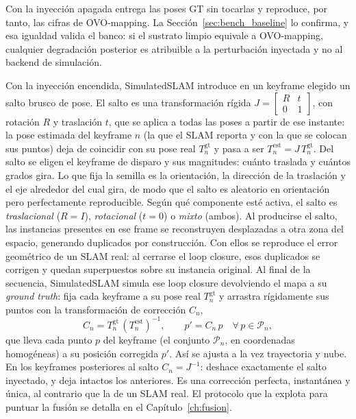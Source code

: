 Con la inyección apagada entrega las poses GT sin tocarlas y reproduce, por tanto, las cifras
de OVO-mapping. La Sección~\ref{sec:bench_baseline} lo confirma, y esa igualdad valida el
banco: si el sustrato limpio equivale a OVO-mapping, cualquier degradación posterior es
atribuible a la perturbación inyectada y no al backend de simulación.

Con la inyección encendida, SimulatedSLAM introduce en un keyframe elegido un salto brusco de
pose. El salto es una transformación rígida
$J = \left[\begin{smallmatrix} R & t \\ 0 & 1\end{smallmatrix}\right]$, con rotación $R$ y
traslación $t$, que se aplica a todas las poses a partir de ese instante: la pose estimada del
keyframe $n$ (la que el SLAM reporta y con la que se colocan sus puntos) deja de coincidir con
su pose real $T^{\mathrm{gt}}_n$ y pasa a ser $T^{\mathrm{est}}_n = J\,T^{\mathrm{gt}}_n$. Del
salto se eligen el keyframe de
disparo y sus magnitudes: cuánto traslada y cuántos grados gira. Lo que fija la semilla es la
orientación, la dirección de la traslación y el eje alrededor del cual gira, de modo que el
salto es aleatorio en orientación pero perfectamente reproducible. Según qué componente esté activa, el salto es
\emph{traslacional} ($R=I$), \emph{rotacional} ($t=0$) o \emph{mixto} (ambos). Al producirse el
salto, las instancias presentes en ese frame se reconstruyen desplazadas a otra zona del
espacio, generando duplicados por construcción. Con ellos se reproduce el error geométrico de
un SLAM real: al cerrarse el loop closure, esos duplicados se corrigen y quedan superpuestos
sobre su instancia original. Al final de la secuencia, SimulatedSLAM simula ese  loop closure devolviendo el mapa a su
\emph{ground truth}: fija cada keyframe a su pose real $T^{\mathrm{gt}}_n$ y arrastra
rígidamente sus puntos con la transformación de corrección $C_n$,
\begin{equation}
  \label{eq:oracle_correction}
  C_n = T^{\mathrm{gt}}_n\,(T^{\mathrm{est}}_n)^{-1}, \qquad p' = C_n\,p \quad \forall\, p \in \mathcal{P}_n,
\end{equation}
que lleva cada punto $p$ del keyframe (el conjunto $\mathcal{P}_n$, en coordenadas homogéneas) a
su posición corregida $p'$. Así se ajusta a la vez trayectoria y nube. En los keyframes
posteriores al salto $C_n = J^{-1}$: deshace exactamente el salto inyectado, y deja intactos los
anteriores. Es una corrección perfecta, instantánea y única, al contrario que la de un
SLAM real. El protocolo que la explota para puntuar la fusión se detalla en el
Capítulo~\ref{ch:fusion}.

